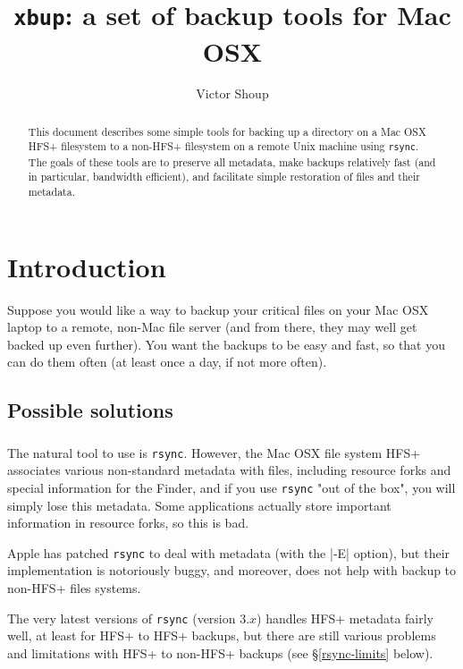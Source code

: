 \documentclass[11pt]{article}
\title{{\tt xbup}: a set of backup tools for Mac OSX}
\author{Victor Shoup}
\begin{document}
\maketitle

\begin{abstract}
This document
describes some simple tools for backing up a directory on a Mac OSX 
HFS+ filesystem to
a non-HFS+ filesystem on a remote Unix machine using \texttt{rsync}.
The goals of these tools 
are to preserve all metadata, make backups relatively 
fast (and in particular, bandwidth efficient),  
and facilitate simple restoration of files and their metadata. 
\end{abstract}

\section{Introduction}

Suppose
you would like a way to backup your critical files on your
Mac OSX laptop to a remote, non-Mac file
server (and from there, they may well get backed up even further).
You want the backups to be easy and fast, so that you can do them 
often (at least once a day, if not more often).

\subsection{Possible solutions}

\subsubsection{\texttt{}}

The natural tool to use is \texttt{rsync}.
However, the Mac OSX 
file system HFS+ associates various non-standard metadata with files,
including resource forks and special information for the Finder,
and if you use \texttt{rsync} "out of the box",  
you will simply lose this metadata.  Some
applications actually store important information in resource forks, so this is
bad.  

Apple has patched \texttt{rsync} to deal with metadata (with the |-E| option),
but 
their implementation is notoriously buggy, and moreover, does not 
help with backup
to non-HFS+ files systems.

The very latest versions of \texttt{rsync} (version 3.$x$) handles HFS+ metadata
fairly well, at least for HFS+ to HFS+ backups,
but there are still various problems and limitations with HFS+ to
non-HFS+ backups (see \S\ref{rsync-limits} below).
\end{document}
